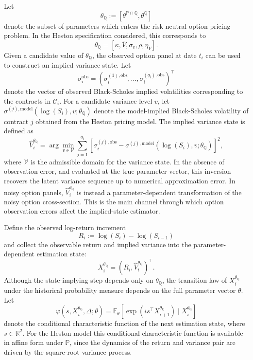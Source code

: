 \documentclass[11pt,a4paper,notitlepage]{article}
\numberwithin{equation}{section}
\begin{document}
Let
\[
\theta_{\mathbb Q}
:=
\left[
\theta^{\mathbb{P}\cap\mathbb{Q}},
\theta^\mathbb{Q}
\right]
\]
denote the subset of parameters which enters the risk-neutral option pricing problem. In the Heston specification considered, this corresponds to
\[
\theta_{\mathbb Q}
=
\left[
\kappa,\bar V,\sigma_v,\rho,\eta_V
\right].
\]
Given a candidate value of \(\theta_{\mathbb Q}\), the observed option panel at date \(t_i\) can be used to construct an implied variance state. Let
\[
\sigma_i^{\mathrm{obs}}
=
\left(
\sigma_i^{(1),\mathrm{obs}},
\dots,
\sigma_i^{(q_i),\mathrm{obs}}
\right)^\top
\]
denote the vector of observed Black-Scholes implied volatilities corresponding to the contracts in \(\mathcal C_i\). For a candidate variance level \(v\), let
\(
\sigma^{(j),\mathrm{model}}
\left(
\log(S_i),v;\theta_{\mathbb Q}
\right)
\)
denote the model-implied Black-Scholes volatility of contract \(j\) obtained from the Heston pricing model. The implied variance state is defined as
\[
\widehat V_i^{\theta_{\mathbb Q}}
=
\arg\min_{v\in\mathcal V}
\sum_{j=1}^{q_i}
\left[
\sigma_i^{(j),\mathrm{obs}}
-
\sigma^{(j),\mathrm{model}}
\left(
\log(S_i),v;\theta_{\mathbb Q}
\right)
\right]^2 ,
\label{eq:is_implied_state}
\]
where \(\mathcal V\) is the admissible domain for the variance state. In the absence of observation error, and evaluated at the true parameter vector, this inversion recovers the latent variance sequence up to numerical approximation error. In noisy option panels, \(\widehat V_i^{\theta_{\mathbb Q}}\) is instead a parameter-dependent transformation of the noisy option cross-section. This is the main channel through which option observation errors affect the implied-state estimator.

Define the observed log-return increment
\[
R_i
:=
\log(S_i)-\log(S_{i-1})
\]
and collect the observable return and implied variance into the parameter-dependent estimation state:
\[
X_i^{\theta_{\mathbb Q}}
=
\left(
R_i,
\widehat V_i^{\theta_{\mathbb Q}}
\right)^\top .
\label{eq:is_state_vector}
\]
Although the state-implying step depends only on \(\theta_{\mathbb Q}\), the transition law of \(X_i^{\theta_{\mathbb Q}}\) under the historical probability measure depends on the full parameter vector \(\theta\). Let
\[
\varphi\left(s,X_i^{\theta_{\mathbb Q}},\Delta;\theta\right)
=
\mathbb E_\theta
\left[
\exp\left(
is^\top X_{i+1}^{\theta_{\mathbb Q}}
\right)
\mid X_i^{\theta_{\mathbb Q}}
\right]
\]
denote the conditional characteristic function of the next estimation state, where \(s\in\mathbb R^2\). For the Heston model this conditional characteristic function is available in affine form under \(\mathbb P\), since the dynamics of the return and variance pair are driven by the square-root variance process.
\end{document}
